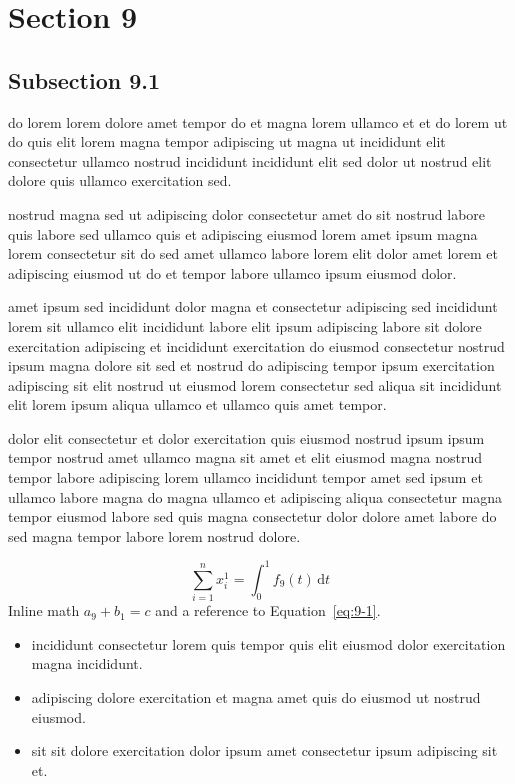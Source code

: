 \documentclass{article}
\begin{document}
\section{Section 9}\label{sec:9}
\subsection{Subsection 9.1}\label{sec:9-1}
do lorem lorem dolore amet tempor do et magna lorem ullamco et et do lorem ut do quis elit lorem magna tempor adipiscing ut magna ut incididunt elit consectetur ullamco nostrud incididunt incididunt elit sed dolor ut nostrud elit dolore quis ullamco exercitation sed.

nostrud magna sed ut adipiscing dolor consectetur amet do sit nostrud labore quis labore sed ullamco quis et adipiscing eiusmod lorem amet ipsum magna lorem consectetur sit do sed amet ullamco labore lorem elit dolor amet lorem et adipiscing eiusmod ut do et tempor labore ullamco ipsum eiusmod dolor.

amet ipsum sed incididunt dolor magna et consectetur adipiscing sed incididunt lorem sit ullamco elit incididunt labore elit ipsum adipiscing labore sit dolore exercitation adipiscing et incididunt exercitation do eiusmod consectetur nostrud ipsum magna dolore sit sed et nostrud do adipiscing tempor ipsum exercitation adipiscing sit elit nostrud ut eiusmod lorem consectetur sed aliqua sit incididunt elit lorem ipsum aliqua ullamco et ullamco quis amet tempor.

dolor elit consectetur et dolor exercitation quis eiusmod nostrud ipsum ipsum tempor nostrud amet ullamco magna sit amet et elit eiusmod magna nostrud tempor labore adipiscing lorem ullamco incididunt tempor amet sed ipsum et ullamco labore magna do magna ullamco et adipiscing aliqua consectetur magna tempor eiusmod labore sed quis magna consectetur dolor dolore amet labore do sed magna tempor labore lorem nostrud dolore.

\begin{equation}\label{eq:9-1}
  \sum_{i=1}^{n} x_i^{1} = \int_0^1 f_{9}(t)\,\mathrm{d}t
\end{equation}
Inline math $a_{9} + b_{1} = c$ and a reference to Equation~\eqref{eq:9-1}.

\begin{itemize}
  \item incididunt consectetur lorem quis tempor quis elit eiusmod dolor exercitation magna incididunt.
  \item adipiscing dolore exercitation et magna amet quis do eiusmod ut nostrud eiusmod.
  \item sit sit dolore exercitation dolor ipsum amet consectetur ipsum adipiscing sit et.
\end{itemize}
\end{document}
